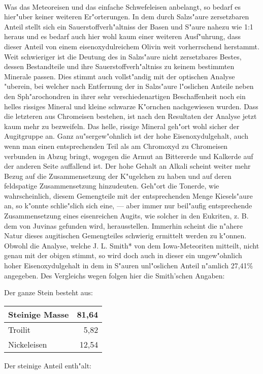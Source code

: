 \documentclass[a4paper, 11pt, oneside]{article}
\begin{document}
\paragraph{}
Was das Meteoreisen und das einfache Schwefeleisen anbelangt, so bedarf es hier"uber keiner weiteren Er"orterungen. In dem durch Salzs"aure zersetzbaren Anteil stellt sich ein Sauerstoffverh"altniss der Basen und S"aure nahezu wie 1:1 heraus und es bedarf auch hier wohl kaum einer weiteren Ausf"uhrung, dass dieser Anteil von einem eisenoxydulreichem Olivin weit vorherrschend herstammt. Weit schwieriger ist die Deutung des in Salzs"aure nicht zersetzbares Bestes, dessen Bestandteile und ihre Sauerstoffverh"altniss zu keinem bestimmten Minerale passen. Dies stimmt auch vollst"andig mit der optischen Analyse "uberein, bei welcher nach Entfernung der in Salzs"aure l"oslichen Anteile neben den Sph"arochondren in ihrer sehr verschiedenartigen Beschaffenheit noch ein helles rissiges Mineral und kleine schwarze K"ornchen nachgewiesen wurden. Dass die letzteren aus Chromeisen bestehen, ist nach den Resultaten der Analyse jetzt kaum mehr zu bezweifeln. Das helle, rissige Mineral geh"ort wohl sicher der Augitgruppe an. Ganz au"sergew"ohnlich ist der hohe Eisenoxydulgehalt, auch wenn man einen entsprechenden Teil als am Chromoxyd zu Chromeisen verbunden in Abzug bringt, wogegen die Armut an Bittererde und Kalkerde auf der anderen Seite auffallend ist. Der hohe Gehalt an Alkali scheint weiter mehr Bezug auf die Zusammensetzung der K"ugelchen zu haben und auf deren feldspatige Zusammensetzung hinzudeuten. Geh"ort die Tonerde, wie wahrscheinlich, diesem Gemengteile mit der entsprechenden Menge Kiesels"aure an, so k"onnte schlie"slich sich eine, --- aber immer nur beil"aufig entsprechende Zusammensetzung eines eisenreichen Augits, wie solcher in den Eukriten, z. B. dem von Juvinas gefunden wird, herausstellen. Immerhin scheint die n"ahere Natur dieses augitischen Gemengteiles schwierig ermittelt werden zu k"onnen. Obwohl die Analyse, welche J. L. Smith* von dem Iowa-Meteoriten mitteilt, nicht genau mit der obigen stimmt, so wird doch auch in dieser ein ungew"ohnlich hoher Eisenoxydulgehalt in dem in S"auren unl"oslichen Anteil n"amlich 27,41\% angegeben. Des Vergleichs wegen folgen hier die Smith'schen Angaben:

Der ganze Stein besteht aus:
\begin{center}
    \begin{tabular}{ |l|r| } 
    \hline
    Steinige Masse & 81,64\\\hline
    Troilit & 5,82\\\hline
    Nickeleisen & 12,54\\
    \hline
    \end{tabular}
\end{center}
Der steinige Anteil enth"alt:
\end{document}
